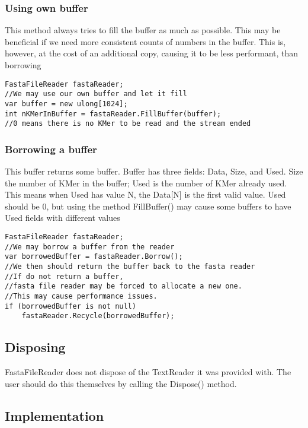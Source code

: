 \subsubsection{Using own buffer}
This method always tries to fill the buffer as much as possible. This may be beneficial if we need more consistent counts of numbers in the buffer. This is, however, at the cost of an additional copy, causing it to be less performant, than borrowing
\begin{lstlisting}
FastaFileReader fastaReader;
//We may use our own buffer and let it fill
var buffer = new ulong[1024];
int nKMerInBuffer = fastaReader.FillBuffer(buffer);
//0 means there is no KMer to be read and the stream ended
\end{lstlisting}
\subsubsection{Borrowing a buffer}
This buffer returns some buffer. Buffer has three fields: Data, Size, and Used. Size the number of KMer in the buffer; Used is the number of KMer already used. This means when Used has value N, the Data[N] is the first valid value. Used should be 0, but using the method FillBuffer() may cause some buffers to have Used fields with different values

\begin{lstlisting}
FastaFileReader fastaReader;
//We may borrow a buffer from the reader 
var borrowedBuffer = fastaReader.Borrow();
//We then should return the buffer back to the fasta reader
//If do not return a buffer,
//fasta file reader may be forced to allocate a new one.
//This may cause performance issues.
if (borrowedBuffer is not null) 
    fastaReader.Recycle(borrowedBuffer);
\end{lstlisting}
\subsection{Disposing}
FastaFileReader does not dispose of the TextReader it was provided with. The user should do this themselves by calling the Dispose() method.

\subsection{Implementation}



    